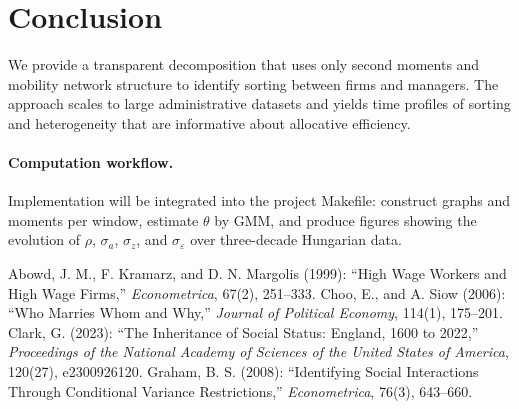 \documentclass[11pt]{article}
\begin{document}
\section{Conclusion}
We provide a transparent decomposition that uses only second moments and mobility network structure to identify sorting between firms and managers. The approach scales to large administrative datasets and yields time profiles of sorting and heterogeneity that are informative about allocative efficiency.

\paragraph{Computation workflow.} Implementation will be integrated into the project Makefile: construct graphs and moments per window, estimate $\theta$ by GMM, and produce figures showing the evolution of $\rho$, $\sigma_a$, $\sigma_z$, and $\sigma_\varepsilon$ over three-decade Hungarian data.


\begin{thebibliography}{9}
 Abowd, J. M., F. Kramarz, and D. N. Margolis (1999): ``High Wage Workers and High Wage Firms,'' \emph{Econometrica}, 67(2), 251--333.
 Choo, E., and A. Siow (2006): ``Who Marries Whom and Why,'' \emph{Journal of Political Economy}, 114(1), 175--201.
 Clark, G. (2023): ``The Inheritance of Social Status: England, 1600 to 2022,'' \emph{Proceedings of the National Academy of Sciences of the United States of America}, 120(27), e2300926120.
 Graham, B. S. (2008): ``Identifying Social Interactions Through Conditional Variance Restrictions,'' \emph{Econometrica}, 76(3), 643--660.
\end{thebibliography}
\end{document}
